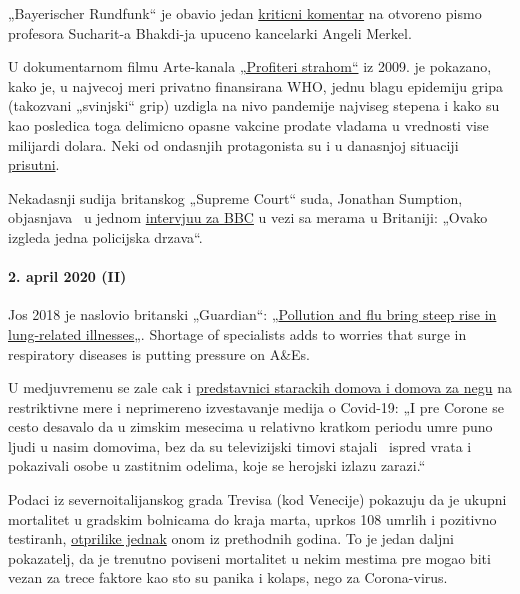 „Bayerischer Rundfunk`` je obavio jedan
\href{https://www.br.de/nachrichten/wissen/bhakdis-brief-an-die-kanzlerin-was-ist-dran-an-seinen-fragen,RutYDhd}{kriticni
komentar} na otvoreno pismo profesora Sucharit-a Bhakdi-ja upuceno
kancelarki Angeli Merkel.

U dokumentarnom filmu Arte-kanala
\href{https://www.youtube.com/watch?v=1--c2SBYlMY}{„Profiteri strahom``}
iz 2009. je pokazano, kako je, u najvecoj meri privatno finansirana WHO,
jednu blagu epidemiju gripa (takozvani „svinjski`` grip) uzdigla na nivo
pandemije najviseg stepena i kako su kao posledica toga delimicno opasne
vakcine prodate vladama u vrednosti vise milijardi dolara. Neki od
ondasnjih protagonista su i u danasnjoj situaciji
\href{https://www.nature.com/articles/news.2009.424}{prisutni}.

Nekadasnji sudija britanskog „Supreme Court`` suda, Jonathan Sumption,
objasnjava ~u jednom
\href{https://www.spectator.co.uk/article/former-supreme-court-justice-this-is-what-a-police-state-is-like-}{intervjuu
za BBC} u vezi sa merama u Britaniji: „Ovako izgleda jedna policijska
drzava``.

\hypertarget{2-april-2020-ii}{%
\paragraph{2. april 2020 (II)}\label{2-april-2020-ii}}

Jos 2018 je naslovio britanski „Guardian``:
„\href{https://www.theguardian.com/society/2018/dec/09/steep-rise-lung-related-illness-hospitals-nhs}{Pollution
and flu bring steep rise in lung-related illnesses}„. Shortage of
specialists adds to worries that surge in respiratory diseases is
putting pressure on A\&Es.

U medjuvremenu se zale cak i
\href{https://pflege-prisma.de/2020/03/31/sterbezahlen-in-pflegeheimen/}{predstavnici
starackih domova i domova za negu} na restriktivne mere i neprimereno
izvestavanje medija o Covid-19: „I pre Corone se cesto desavalo da u
zimskim mesecima u relativno kratkom periodu umre puno ljudi u nasim
domovima, bez da su televizijski timovi stajali ~ispred vrata i
pokazivali osobe u zastitnim odelima, koje se herojski izlazu zarazi.``

Podaci iz severnoitalijanskog grada Trevisa (kod Venecije) pokazuju da
je ukupni mortalitet u gradskim bolnicama do kraja marta, uprkos 108
umrlih i pozitivno testiranh,
\href{https://swprs.files.wordpress.com/2020/04/reppublica-treviso.jpg}{otprilike
jednak} onom iz prethodnih godina. To je jedan daljni pokazatelj, da je
trenutno poviseni mortalitet u nekim mestima pre mogao biti vezan za
trece faktore kao sto su panika i kolaps, nego za Corona-virus.

